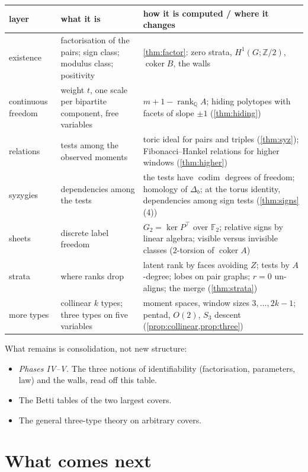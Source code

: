 \documentclass[11pt]{article}
\theoremstyle{definition}\newtheorem{definition}[theorem]{Definition}\newtheorem{remark}[theorem]{Remark}\newtheorem{example}[theorem]{Example}
\begin{document}
\begin{center}\small
\begin{tabular}{p{}p{}p{}}\toprule
layer & what it is & how it is computed / where it changes\\\midrule
existence & factorisation of the pairs; sign class; modulus class; positivity & \cref{thm:factor}: zero strata, $H^1(G;\mathbb Z/2)$, $\operatorname{coker}B$, the walls\\
continuous freedom & weight $t$, one scale per bipartite component, free variables & $m+1-\operatorname{rank}_\mathbb QA$; hiding polytopes with facets of slope $\pm1$ (\cref{thm:hiding})\\
relations & tests among the observed moments & toric ideal for pairs and triples (\cref{thm:syz}); Fibonacci--Hankel relations for higher windows (\cref{thm:higher})\\
syzygies & dependencies among the tests & the tests have $\operatorname{codim}$ degrees of freedom; homology of $\Delta_b$; at the torus identity, dependencies among sign tests (\cref{thm:signs}(4))\\
sheets & discrete label freedom & $G_2=\ker P^\top$ over $\mathbb F_2$; relative signs by linear algebra; visible versus invisible classes ($2$-torsion of $\operatorname{coker}A$)\\
strata & where ranks drop & latent rank by faces avoiding $Z$; tests by $A$-degree; lobes on pair graphs; $r=0$ un-aligns; the merge (\cref{thm:strata})\\
more types & collinear $k$ types; three types on five variables & moment spaces, window sizes $3,\dots,2k-1$; pentad, $O(2)$, $S_3$ descent (\cref{prop:collinear,prop:three})\\\bottomrule
\end{tabular}
\end{center}

What remains is consolidation, not new structure:
\begin{itemize}
\item \emph{Phases IV--V.} The three notions of identifiability (factorisation, parameters, law) and the walls, read off this table.
\item The Betti tables of the two largest covers.
\item The general three-type theory on arbitrary covers.
\end{itemize}

\section{What comes next}\label{sec:next}
\end{document}
